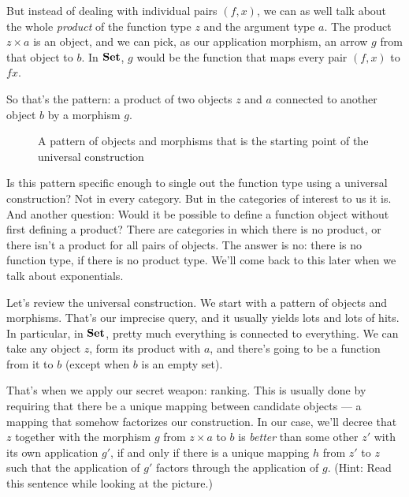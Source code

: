 But instead of dealing with individual pairs $(f, x)$, we can as
well talk about the whole \emph{product} of the function type $z$
and the argument type $a$. The product $z\times{}a$ is an object,
and we can pick, as our application morphism, an arrow $g$ from
that object to $b$. In $\mathbf{Set}$, $g$ would be the
function that maps every pair $(f, x)$ to $f x$.

So that's the pattern: a product of two objects $z$ and
$a$ connected to another object $b$ by a morphism $g$.

\begin{figure}
\centering
{}
\caption{A pattern of objects and morphisms that is the starting point of the
universal construction}
\end{figure}

Is this pattern specific enough to single out the function type using a
universal construction? Not in every category. But in the categories of
interest to us it is. And another question: Would it be possible to
define a function object without first defining a product? There are
categories in which there is no product, or there isn't a product for
all pairs of objects. The answer is no: there is no function type, if
there is no product type. We'll come back to this later when we talk
about exponentials.

Let's review the universal construction. We start with a pattern of
objects and morphisms. That's our imprecise query, and it usually yields
lots and lots of hits. In particular, in $\mathbf{Set}$, pretty much
everything is connected to everything. We can take any object
$z$, form its product with $a$, and there's going to be a
function from it to $b$ (except when $b$ is an empty set).

That's when we apply our secret weapon: ranking. This is usually done by
requiring that there be a unique mapping between candidate objects --- a
mapping that somehow factorizes our construction. In our case, we'll
decree that $z$ together with the morphism $g$ from
$z\times a$ to $b$ is \emph{better} than some other
$z'$ with its own application $g'$, if and
only if there is a unique mapping $h$ from $z'$ to
$z$ such that the application of $g'$ factors
through the application of $g$. (Hint: Read this sentence while
looking at the picture.)

